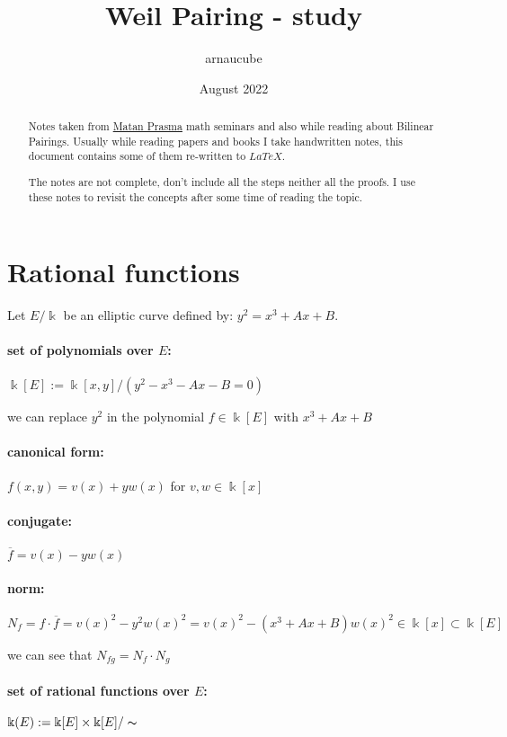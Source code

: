 \documentclass{article}
\title{Weil Pairing - study}
\author{arnaucube}
\date{August 2022}
\theoremstyle{definition}
\begin{document}
\maketitle

\begin{abstract}
  Notes taken from \href{https://sites.google.com/view/matanprasmashomepage/publications}{Matan Prasma} math seminars and also while reading about Bilinear Pairings. Usually while reading papers and books I take handwritten notes, this document contains some of them re-written to $LaTeX$.

	The notes are not complete, don't include all the steps neither all the proofs. I use these notes to revisit the concepts after some time of reading the topic.
\end{abstract}

\tableofcontents

\section{Rational functions}

Let $E/\Bbbk$ be an elliptic curve defined by: $y^2 = x^3 + Ax + B$.

\paragraph{set of polynomials over $E$:}
$\Bbbk[E] := \Bbbk[x,y] / (y^2 - x^3 - Ax - B =0)$

we can replace $y^2$ in the polynomial $f \in \Bbbk[E]$ with $x^3 + Ax + B$

\paragraph{canonical form:} $f(x,y) = v(x)+y w(x)$ for $v, w \in \Bbbk[x]$
\paragraph{conjugate:} $\overline{f} = v(x) - y w(x)$
\paragraph{norm:} $N_f = f \cdot \overline{f} = v(x)^2 - y^2 w(x)^2 = v(x)^2 - (x^3 + Ax + B) w(x)^2 \in \Bbbk[x] \subset \Bbbk[E]$

we can see that $N_{fg} = N_f \cdot N_g$

\paragraph{set of rational functions over $E$:}
$\Bbbk(E) := \Bbbk[E] \times \Bbbk[E]/ \thicksim$
\end{document}
